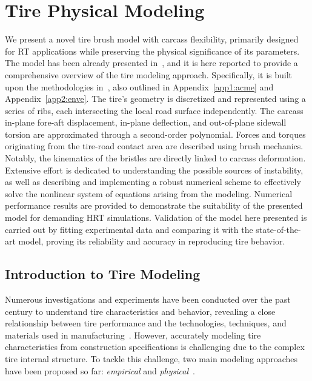 
\chapter{Tire Physical Modeling}
\label{app3:tirex}

We present a novel tire brush model with carcass flexibility, primarily designed for \ac{RT} applications while preserving the physical significance of its parameters. The model has been already presented in~\cite{stocco2024physical}, and it is here reported to provide a comprehensive overview of the tire modeling approach. Specifically, it is built upon the methodologies in~\cite{stocco2021acme,stocco2024novel}, also outlined in Appendix~\ref{app1:acme} and Appendix~\ref{app2:enve}. The tire's geometry is discretized and represented using a series of ribs, each intersecting the local road surface independently. The carcass in-plane fore-aft displacement, in-plane deflection, and out-of-plane sidewall torsion are approximated through a second-order polynomial. Forces and torques originating from the tire-road contact area are described using brush mechanics. Notably, the kinematics of the bristles are directly linked to carcass deformation. Extensive effort is dedicated to understanding the possible sources of instability, as well as describing and implementing a robust numerical scheme to effectively solve the nonlinear system of equations arising from the modeling. Numerical performance results are provided to demonstrate the suitability of the presented model for demanding \ac{HRT} simulations. Validation of the model here presented is carried out by fitting experimental data and comparing it with the state-of-the-art \MagicFormulae{} model, proving its reliability and accuracy in reproducing tire behavior.


\section{Introduction to Tire Modeling}
\label{app3:sec:introduction}

Numerous investigations and experiments have been conducted over the past century to understand tire characteristics and behavior, revealing a close relationship between tire performance and the technologies, techniques, and materials used in manufacturing~\cite{nakajima2019advanced, gil2020inplane}. However, accurately modeling tire characteristics from construction specifications is challenging due to the complex tire internal structure. To tackle this challenge, two main modeling approaches have been proposed so far: \emph{empirical} and \emph{physical}~\cite{guiggiani2014science, rill2020road, pacejka2012tire, oertel2015years}.

